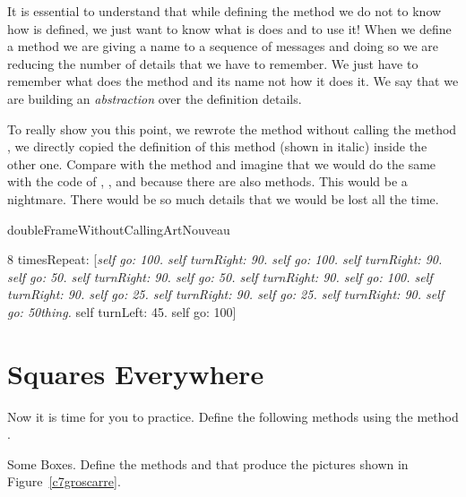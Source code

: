 It is essential to understand that while defining the method  we do not to know how  is defined, we just want to know what is does and to use it!  When we define a method we are giving a name to a sequence of messages and doing so we are reducing the number of details that we have to remember.  We just have to remember what does the method and its name not how it does it.  We say that we are building an \emph{abstraction} over the definition details.

To really show you this point, we rewrote the method
 without calling the method , we directly copied the definition of this method (shown in italic) inside the other one. Compare with the method  and imagine that we would do the same with the code of \turnRight, \turnLeft, and \go because there are also methods. This would be a nightmare. There would be so much details that we would be lost all the time. 

\begin{method}
doubleFrameWithoutCallingArtNouveau

   8 timesRepeat: [\textit{self go: 100.
                  self turnRight: 90.
                  self go: 100.
                  self turnRight: 90.
                  self go: 50.
                  self turnRight: 90.
                  self go: 50.
                  self turnRight: 90.
                  self go: 100.
                  self turnRight: 90.
                  self go: 25.
                  self turnRight: 90.
                  self go: 25.
                  self turnRight: 90.
                  self go: 50thing.}
                  self turnLeft: 45. 
                  self go: 100]
\end{method}




\section{Squares Everywhere}
Now it is time for you to practice. Define the following methods using the method .


\begin{exonofig}{Some Boxes.}
Define the methods  and  that produce the 
pictures shown in Figure~\ref{c7groscarre}.
\end{exonofig}

